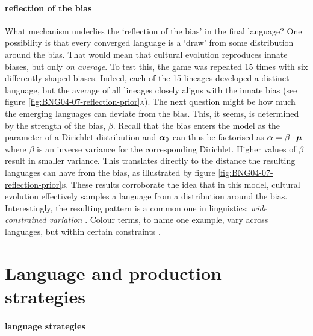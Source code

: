 \documentclass{../src/bcthesispart}
\begin{document}
\paragraph{reflection of the bias}

What mechanism underlies the ‘reflection of the bias’ in the final language?
One possibility is that every converged language is a ‘draw’ from some distribution around the bias.
That would mean that cultural evolution reproduces innate biases, but only \emph{on average}.
To test this, the game was repeated 15 times with six differently shaped biases.
Indeed, each of the 15 lineages developed a distinct language, but the average of all lineages closely aligns with the innate bias (see figure \ref{fig:BNG04-07-reflection-prior}\textsc{a}).
The next question might be how much the emerging languages can deviate from the bias. 
This, it seems, is determined by the strength of the bias, $\beta$. 
Recall that the bias enters the model as the parameter of a Dirichlet distribution and $\boldsymbol{\mathbf{\alpha}}_0$ can thus be factorised as $\boldsymbol{\mathbf{\alpha}} = \beta\cdot\boldsymbol{\mathbf{\mu}}$ where $\beta$ is an inverse variance for the corresponding Dirichlet. 
Higher values of $\beta$ result in smaller variance.
This translates directly to the distance the resulting languages can have from the bias, as illustrated by figure \ref{fig:BNG04-07-reflection-prior}\textsc{b}.
These results corroborate the idea that in this model, cultural evolution effectively samples a language from a distribution around the bias. 
Interestingly, the resulting pattern is a common one in linguistics: \emph{wide constrained variation} \parencite{Regier2015}.
Colour terms, to name one example, vary across languages, but within certain constraints \textcite{Regier2015}.






\section{Language and production strategies}




\paragraph{language strategies}
\end{document}
